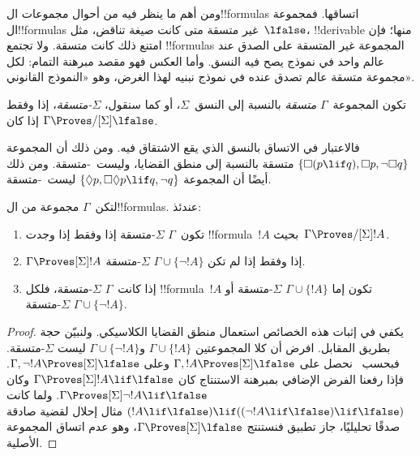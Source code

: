 \documentclass[../../../include/open-logic-section]{subfiles}
\begin{document}


ومن أهم ما ينظر فيه من أحوال مجموعات ال!!{formula}s اتساقها.
فمجموعة ال!!{formula}s غير متسقة متى كانت صيغة تناقض،
مثل~$\lfalse$، !!{derivable} منها؛ فإن امتنع ذلك كانت متسقة.
ولا تجتمع !!{formula}s المجموعة غير المتسقة على الصدق عند عالم واحد
في نموذج يصح فيه النسق. وأما العكس فهو مقصد مبرهنة التمام:
لكل مجموعة متسقة عالم تصدق عنده في نموذج نبنيه لهذا الغرض،
وهو «النموذج القانوني».

\begin{defn}
  تكون المجموعة~$\Gamma$ \emph{متسقة} بالنسبة إلى النسق~$\Sigma$، أو
  كما سنقول، \emph{$\Sigma$-متسقة}، إذا وفقط إذا كان
  $\Gamma \Proves/[\Sigma] \lfalse$.
\end{defn}

فالاعتبار في الاتساق بالنسق الذي يقع الاشتقاق فيه. ومن ذلك أن المجموعة
$\{\Box(p \lif q), \Box p, \lnot\Box q\}$ متسقة بالنسبة إلى منطق القضايا،
وليست~-متسقة. ومن ذلك أيضًا أن المجموعة
$\{\Diamond p, \Box\Diamond p \lif q, \lnot q\}$
ليست~-متسقة.

\begin{prop}
  لتكن~$\Gamma$ مجموعة من ال!!{formula}s. عندئذ:
  \begin{enumerate}
  \item تكون~$\Gamma$ $\Sigma$-متسقة إذا وفقط إذا وجدت
    !!{formula}~$!A$ بحيث~$\Gamma \Proves/[\Sigma] !A$.
  \item {}%
    $\Gamma \Proves[\Sigma] !A$ إذا وفقط إذا لم تكن
    $\Gamma \cup \{\lnot!A\}$ $\Sigma$-متسقة.
  \item {}%
    إذا كانت~$\Gamma$ $\Sigma$-متسقة، فلكل !!{formula}~$!A$ تكون إما
    $\Gamma \cup \{!A\}$ $\Sigma$-متسقة أو
    $\Gamma \cup \{\lnot!A\}$ $\Sigma$-متسقة.
  \end{enumerate}
\end{prop}

\begin{proof}
  يكفي في إثبات هذه الخصائص استعمال منطق القضايا الكلاسيكي.
  ولنبيّن حجة  بطريق المقابل.
  افرض أن كلا المجموعتين $\Gamma \cup \{!A\}$ و$\Gamma \cup \{\lnot!A\}$
  ليست $ \Sigma$-متسقة. فبحسب~ نحصل على
  $\Gamma, !A \Proves[\Sigma] \lfalse$ وعلى
  $\Gamma, \lnot !A \Proves[\Sigma] \lfalse$. فإذا رفعنا الفرض الإضافي
  بمبرهنة الاستنتاج كان
  $\Gamma \Proves[\Sigma] !A \lif \lfalse$ وكان
  $\Gamma \Proves[\Sigma] \lnot!A \lif \lfalse$. ولما كانت
  $(!A \lif \lfalse) \lif ((\lnot!A \lif \lfalse) \lif \lfalse)$
  مثال إحلال لقضية صادقة صدقًا تحليليًا، جاز تطبيق
  فنستنتج $\Gamma \Proves[\Sigma] \lfalse$، وهو عدم اتساق المجموعة الأصلية.
\end{proof}
\end{document}

